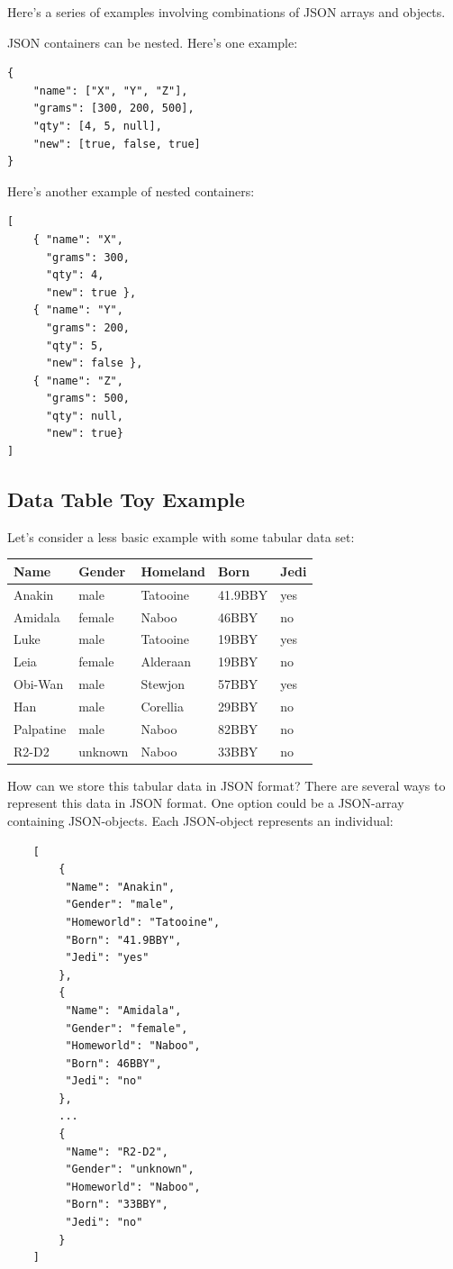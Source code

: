 \documentclass[
]{book}
\begin{document}
Here's a series of examples involving combinations of JSON arrays and objects.

JSON containers can be nested. Here's one example:

\begin{verbatim}
{
    "name": ["X", "Y", "Z"],
    "grams": [300, 200, 500], 
    "qty": [4, 5, null],
    "new": [true, false, true]
}
\end{verbatim}

Here's another example of nested containers:

\begin{verbatim}
[
    { "name": "X", 
      "grams": 300,
      "qty": 4,
      "new": true },
    { "name": "Y",
      "grams": 200,
      "qty": 5,
      "new": false },
    { "name": "Z",
      "grams": 500, 
      "qty": null,
      "new": true}
]
\end{verbatim}

\hypertarget{data-table-toy-example}{%
\subsection{Data Table Toy Example}\label{data-table-toy-example}}

Let's consider a less basic example with some tabular data set:

\begin{longtable}[]{@{}lllll@{}}
\toprule()
Name & Gender & Homeland & Born & Jedi \\
\midrule()
\endhead
Anakin & male & Tatooine & 41.9BBY & yes \\
Amidala & female & Naboo & 46BBY & no \\
Luke & male & Tatooine & 19BBY & yes \\
Leia & female & Alderaan & 19BBY & no \\
Obi-Wan & male & Stewjon & 57BBY & yes \\
Han & male & Corellia & 29BBY & no \\
Palpatine & male & Naboo & 82BBY & no \\
R2-D2 & unknown & Naboo & 33BBY & no \\
\bottomrule()
\end{longtable}

How can we store this tabular data in JSON format? There are several ways to
represent this data in JSON format. One option could be a JSON-array containing
JSON-objects. Each JSON-object represents an individual:

\begin{verbatim}
    [
        {
         "Name": "Anakin",
         "Gender": "male", 
         "Homeworld": "Tatooine",
         "Born": "41.9BBY",
         "Jedi": "yes"
        },
        {
         "Name": "Amidala",
         "Gender": "female", 
         "Homeworld": "Naboo",
         "Born": 46BBY",
         "Jedi": "no"
        },
        ...
        {
         "Name": "R2-D2",
         "Gender": "unknown",
         "Homeworld": "Naboo",
         "Born": "33BBY",
         "Jedi": "no"
        }
    ]
\end{verbatim}
\end{document}
